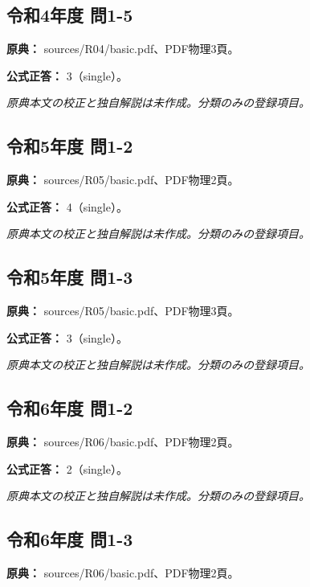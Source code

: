 \subsection{令和4年度 問1-5}
\label{q:r04-reg-basic-1-5}

\noindent\textbf{原典：} sources/R04/basic.pdf、PDF物理3頁。

\textbf{公式正答：} 3（single）。

\par\textit{原典本文の校正と独自解説は未作成。分類のみの登録項目。}

\subsection{令和5年度 問1-2}
\label{q:r05-reg-basic-1-2}

\noindent\textbf{原典：} sources/R05/basic.pdf、PDF物理2頁。

\textbf{公式正答：} 4（single）。

\par\textit{原典本文の校正と独自解説は未作成。分類のみの登録項目。}

\subsection{令和5年度 問1-3}
\label{q:r05-reg-basic-1-3}

\noindent\textbf{原典：} sources/R05/basic.pdf、PDF物理3頁。

\textbf{公式正答：} 3（single）。

\par\textit{原典本文の校正と独自解説は未作成。分類のみの登録項目。}

\subsection{令和6年度 問1-2}
\label{q:r06-reg-basic-1-2}

\noindent\textbf{原典：} sources/R06/basic.pdf、PDF物理2頁。

\textbf{公式正答：} 2（single）。

\par\textit{原典本文の校正と独自解説は未作成。分類のみの登録項目。}

\subsection{令和6年度 問1-3}
\label{q:r06-reg-basic-1-3}

\noindent\textbf{原典：} sources/R06/basic.pdf、PDF物理2頁。

